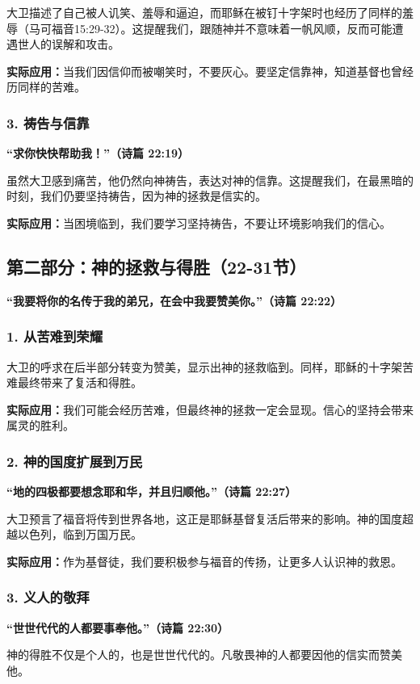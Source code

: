 \documentclass[a4paper, 12pt]{article}
\begin{document}
大卫描述了自己被人讥笑、羞辱和逼迫，而耶稣在被钉十字架时也经历了同样的羞辱（马可福音15:29-32）。这提醒我们，跟随神并不意味着一帆风顺，反而可能遭遇世人的误解和攻击。

\textbf{实际应用：}当我们因信仰而被嘲笑时，不要灰心。要坚定信靠神，知道基督也曾经历同样的苦难。

\subsubsection*{3. 祷告与信靠}
\textbf{“求你快快帮助我！”（诗篇 22:19）}

虽然大卫感到痛苦，他仍然向神祷告，表达对神的信靠。这提醒我们，在最黑暗的时刻，我们仍要坚持祷告，因为神的拯救是信实的。

\textbf{实际应用：}当困境临到，我们要学习坚持祷告，不要让环境影响我们的信心。

\subsection*{第二部分：神的拯救与得胜（22-31节）}

\textbf{“我要将你的名传于我的弟兄，在会中我要赞美你。”（诗篇 22:22）}

\subsubsection*{1. 从苦难到荣耀}
大卫的呼求在后半部分转变为赞美，显示出神的拯救临到。同样，耶稣的十字架苦难最终带来了复活和得胜。

\textbf{实际应用：}我们可能会经历苦难，但最终神的拯救一定会显现。信心的坚持会带来属灵的胜利。

\subsubsection*{2. 神的国度扩展到万民}
\textbf{“地的四极都要想念耶和华，并且归顺他。”（诗篇 22:27）}

大卫预言了福音将传到世界各地，这正是耶稣基督复活后带来的影响。神的国度超越以色列，临到万国万民。

\textbf{实际应用：}作为基督徒，我们要积极参与福音的传扬，让更多人认识神的救恩。

\subsubsection*{3. 义人的敬拜}
\textbf{“世世代代的人都要事奉他。”（诗篇 22:30）}

神的得胜不仅是个人的，也是世世代代的。凡敬畏神的人都要因他的信实而赞美他。
\end{document}
